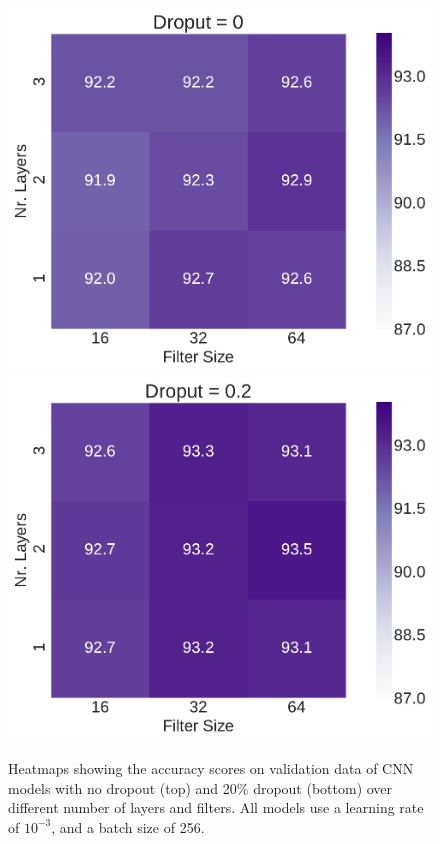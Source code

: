 \documentclass[10pt, twocolumn]{article}
\begin{document}
\begin{figure}[H]
    \centering
\includegraphics[scale=0.4]{../figs/CNN_network_size_0d.pdf}
\includegraphics[scale=0.4]{../figs/CNN_network_size_20d.pdf}
    \caption{Heatmaps showing the accuracy scores on validation data of CNN models with no dropout (top) and 20\% dropout (bottom) over different number of layers and filters. All models use a learning rate of $10^{-3}$, and a batch size of 256.}
    \label{fig:CNN_network_size_heatmap}
\end{figure}
\end{document}

